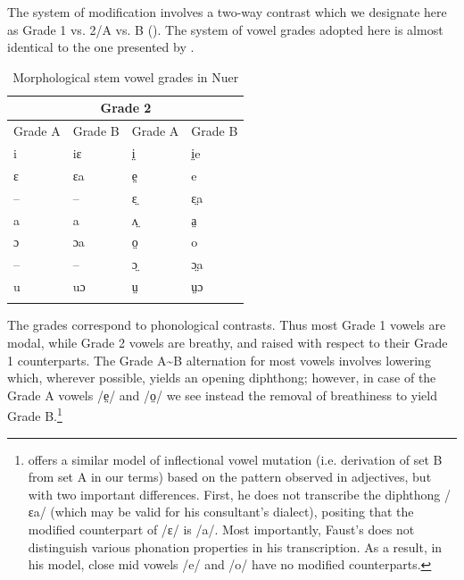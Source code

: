 \documentclass[output=paper,newtxmath,modfonts,nonflat]{langsci/langscibook}
\begin{document}
The system of  modification involves a two-way contrast which we designate here as Grade 1 vs. 2/A vs. B (). The system of vowel grades adopted here is almost identical to the one presented by \citet{reid2016}.

\begin{table}
\begin{tabularx}{\textwidth}{XXXX}
\lsptoprule

\multicolumn{2}{c}{Grade 1} & \multicolumn{2}{c}{Grade 2}\\
\midrule
  Grade A &  Grade B &  Grade A &  Grade B\\
 i & iɛ & i̤ & i̤e\\
 ɛ & ɛa & e̤ & e\\
 -- & -- & ɛ̤ & ɛ̤a\\
 a & a & ʌ̤ & a̤\\
 ɔ & ɔa & o̤ & o\\
 -- & -- & ɔ̤ & ɔ̤a\\
 u & uɔ & ṳ & ṳɔ\\
\lspbottomrule
\end{tabularx}
\caption{Morphological stem vowel grades in Nuer}
\label{tab:monich:4}
\end{table}

The grades correspond to phonological contrasts. Thus most Grade 1 vowels are modal, while Grade 2 vowels are breathy, and raised with respect to their Grade 1 counterparts. The Grade A{\textasciitilde}B alternation for most vowels involves lowering which, wherever possible, yields an opening diphthong; however, in case of the Grade A vowels /e̤/ and /o̤/ we see instead the removal of breathiness to yield Grade B.\footnote{\citet{Faust2017} offers a similar model of inflectional vowel mutation (i.e. derivation of set B from set A in our terms) based on the pattern observed in adjectives, but with two important differences. First, he does not transcribe the diphthong /ɛa/ (which may be valid for his consultant’s dialect), positing that the modified counterpart of /ɛ/ is /a/. Most importantly, Faust’s does not distinguish various phonation properties in his transcription. As a result, in his model, close mid vowels /e/ and /o/ have no modified counterparts.}  
\end{document}
